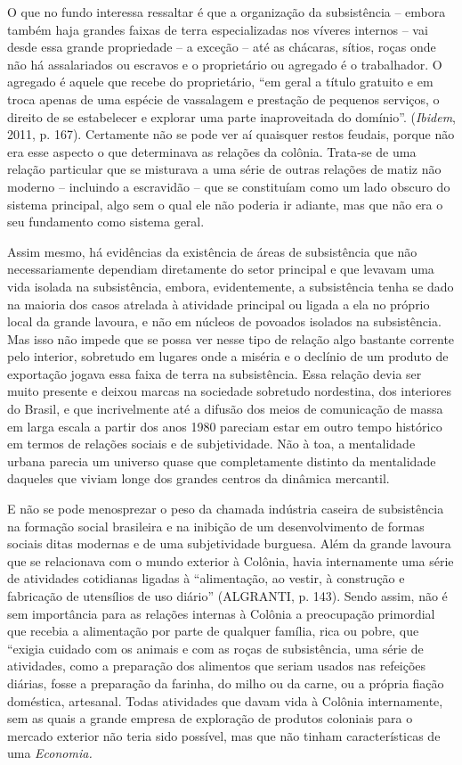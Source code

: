 O que no fundo interessa ressaltar é que a organização da subsistência
-- embora também haja grandes faixas de terra especializadas nos víveres
internos -- vai desde essa grande propriedade -- a exceção -- até as
chácaras, sítios, roças onde não há assalariados ou escravos e o
proprietário ou agregado é o trabalhador. O agregado é aquele que recebe
do proprietário, ``em geral a título gratuito e em troca apenas de uma
espécie de vassalagem e prestação de pequenos serviços, o direito de se
estabelecer e explorar uma parte inaproveitada do domínio''.
(\emph{Ibidem}, 2011, p. 167). Certamente não se pode ver aí quaisquer
restos feudais, porque não era esse aspecto o que determinava as
relações da colônia. Trata-se de uma relação particular que se misturava
a uma série de outras relações de matiz não moderno -- incluindo a
escravidão -- que se constituíam como um lado obscuro do sistema
principal, algo sem o qual ele não poderia ir adiante, mas que não era o
seu fundamento como sistema geral.

Assim mesmo, há evidências da existência de áreas de subsistência que
não necessariamente dependiam diretamente do setor principal e que
levavam uma vida isolada na subsistência, embora, evidentemente, a
subsistência tenha se dado na maioria dos casos atrelada à atividade
principal ou ligada a ela no próprio local da grande lavoura, e não em
núcleos de povoados isolados na subsistência. Mas isso não impede que se
possa ver nesse tipo de relação algo bastante corrente pelo interior,
sobretudo em lugares onde a miséria e o declínio de um produto de
exportação jogava essa faixa de terra na subsistência. Essa relação
devia ser muito presente e deixou marcas na sociedade sobretudo
nordestina, dos interiores do Brasil, e que incrivelmente até a difusão
dos meios de comunicação de massa em larga escala a partir dos anos 1980
pareciam estar em outro tempo histórico em termos de relações sociais e
de subjetividade. Não à toa, a mentalidade urbana parecia um universo
quase que completamente distinto da mentalidade daqueles que viviam
longe dos grandes centros da dinâmica mercantil.

E não se pode menosprezar o peso da chamada indústria caseira de
subsistência na formação social brasileira e na inibição de um
desenvolvimento de formas sociais ditas modernas e de uma subjetividade
burguesa. Além da grande lavoura que se relacionava com o mundo exterior
à Colônia, havia internamente uma série de atividades cotidianas ligadas
à ``alimentação, ao vestir, à construção e fabricação de utensílios de
uso diário'' (ALGRANTI, p. 143). Sendo assim, não é sem importância para
as relações internas à Colônia a preocupação primordial que recebia a
alimentação por parte de qualquer família, rica ou pobre, que ``exigia
cuidado com os animais e com as roças de subsistência, uma série de
atividades, como a preparação dos alimentos que seriam usados nas
refeições diárias, fosse a preparação da farinha, do milho ou da carne,
ou a própria fiação doméstica, artesanal. Todas atividades que davam
vida à Colônia internamente, sem as quais a grande empresa de exploração
de produtos coloniais para o mercado exterior não teria sido possível,
mas que não tinham características de uma \emph{Economia.}

